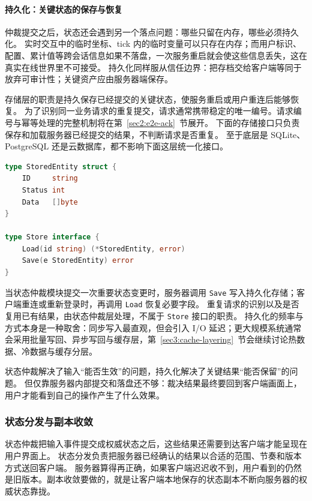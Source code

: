 \paragraph{持久化：关键状态的保存与恢复}

仲裁提交之后，状态还会遇到另一个落点问题：哪些只留在内存，哪些必须持久化。
实时交互中的临时坐标、tick 内的临时变量可以只存在内存；而用户标识、配置、累计值等跨会话信息如果不落盘，一次服务重启就会使这些信息丢失，这在真实在线世界里不可接受。
持久化同样服从信任边界：把存档交给客户端等同于放弃可审计性；关键资产应由服务器端保存。

存储层的职责是持久保存已经提交的关键状态，使服务重启或用户重连后能够恢复。
为了识别同一业务请求的重复提交，请求通常携带稳定的唯一编号。请求编号与幂等处理的完整机制将在第~\ref{sec2:e2e-ack}~节展开。
下面的存储接口只负责保存和加载服务器已经提交的结果，不判断请求是否重复。
至于底层是 SQLite、PostgreSQL 还是云数据库，都不影响下面这层统一化接口。

\begin{tcolorbox}[title=持久化存储接口]
\begin{lstlisting}[style=codeblock, language=go]
type StoredEntity struct {
    ID     string
    Status int
    Data   []byte
}

type Store interface {
    Load(id string) (*StoredEntity, error)
    Save(e StoredEntity) error
}
\end{lstlisting}
\end{tcolorbox}

当状态仲裁模块提交一次重要状态变更时，服务器调用 \texttt{Save} 写入持久化存储；客户端重连或重新登录时，再调用 \texttt{Load} 恢复必要字段。
重复请求的识别以及是否复用已有结果，由状态仲裁层处理，不属于 \texttt{Store} 接口的职责。
持久化的频率与方式本身是一种取舍：同步写入最直观，但会引入 I/O 延迟；更大规模系统通常会采用批量写回、异步写回与缓存层，第~\ref{sec3:cache-layering}~节会继续讨论热数据、冷数据与缓存分层。

状态仲裁解决了输入“能否生效”的问题，持久化解决了关键结果“能否保留”的问题。
但仅靠服务器内部提交和落盘还不够：裁决结果最终要回到客户端画面上，用户才能看到自己的操作产生了什么效果。

\subsubsection{状态分发与副本收敛}\label{sec2:world-sync}

状态仲裁把输入事件提交成权威状态之后，这些结果还需要到达客户端才能呈现在用户界面上。
状态分发负责把服务器已经确认的结果以合适的范围、节奏和版本方式送回客户端。
服务器算得再正确，如果客户端迟迟收不到，用户看到的仍然是旧版本。副本收敛要做的，就是让客户端本地保存的状态副本不断向服务器的权威状态靠拢。

